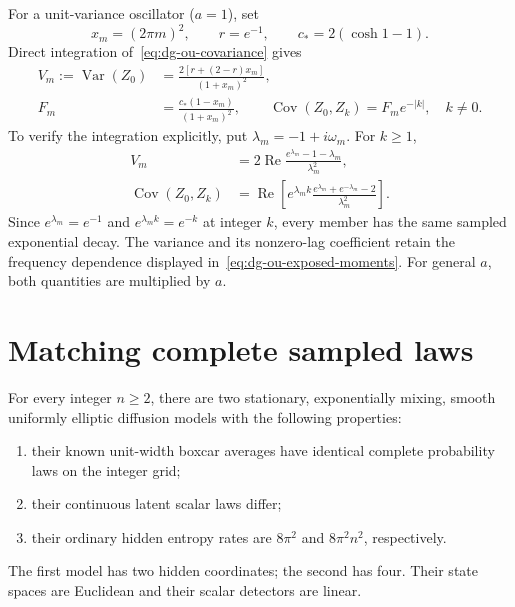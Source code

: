 For a unit-variance oscillator ($a=1$), set
\[
 x_m=(2\pi m)^2,\qquad r=e^{-1},\qquad c_*=2(\cosh1-1).
\]
Direct integration of~\eqref{eq:dg-ou-covariance} gives
\begin{align}
 V_m:=\operatorname{Var}(Z_0)
 &=\frac{2[r+(2-r)x_m]}{(1+x_m)^2},\\
 F_m&=\frac{c_*(1-x_m)}{(1+x_m)^2},\qquad
 \operatorname{Cov}(Z_0,Z_k)=F_m e^{-|k|},\quad k\ne0.
 \label{eq:dg-ou-exposed-moments}
\end{align}
To verify the integration explicitly, put $\lambda_m=-1+i\omega_m$.
For $k\geq1$,
\begin{align*}
 V_m
 &=2\operatorname{Re}
    \frac{e^{\lambda_m}-1-\lambda_m}{\lambda_m^2},\\
 \operatorname{Cov}(Z_0,Z_k)
 &=\operatorname{Re}\left[
 e^{\lambda_m k}
 \frac{e^{\lambda_m}+e^{-\lambda_m}-2}{\lambda_m^2}\right].
\end{align*}
Since $e^{\lambda_m}=e^{-1}$ and
$e^{\lambda_m k}=e^{-k}$ at integer $k$, every member has the same sampled
exponential decay. The variance and its nonzero-lag coefficient retain the
frequency dependence displayed in~\eqref{eq:dg-ou-exposed-moments}.
For general $a$, both quantities are multiplied by $a$.

\section{Matching complete sampled laws}

\begin{theorem}
\label{thm:dg-ou-ambiguity}
For every integer $n\geq2$, there are two stationary, exponentially mixing,
smooth uniformly elliptic diffusion models with the following properties:
\begin{enumerate}
 \item their known unit-width boxcar averages have identical complete
       probability laws on the integer grid;
 \item their continuous latent scalar laws differ;
 \item their ordinary hidden entropy rates are $8\pi^2$ and
       $8\pi^2n^2$, respectively.
\end{enumerate}
The first model has two hidden coordinates; the second has four. Their
state spaces are Euclidean and their scalar detectors are linear.
\end{theorem}

